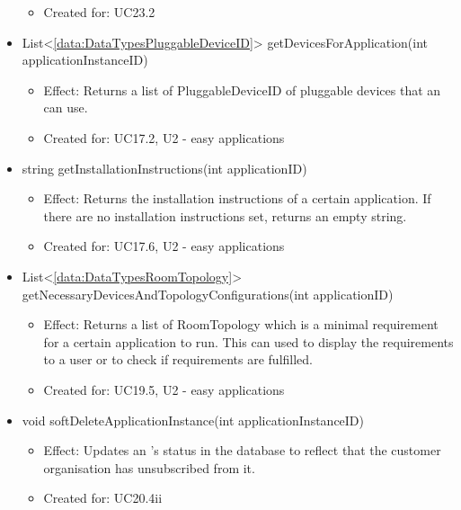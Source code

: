 \begin{description}
\begin{itemize}[noitemsep,nolistsep,leftmargin=-.25cm]
\begin{itemize}[noitemsep,nolistsep]
\item Created for: UC23.2
        \end{itemize}
      \item \textsf{List\textless{}\ref{data:DataTypesPluggableDeviceID}\textgreater{} getDevicesForApplication(int applicationInstanceID)}
        \begin{itemize}[noitemsep,nolistsep]
           \item Effect: Returns a list of PluggableDeviceID of pluggable devices that an  can use.
\item Created for: UC17.2, U2 - easy applications
        \end{itemize}
      \item \textsf{string getInstallationInstructions(int applicationID)}
        \begin{itemize}[noitemsep,nolistsep]
           \item Effect: Returns the installation instructions of a certain application. If there are no installation instructions set, returns an empty string.
\item Created for: UC17.6, U2 - easy applications
        \end{itemize}
      \item \textsf{List\textless{}\ref{data:DataTypesRoomTopology}\textgreater{} getNecessaryDevicesAndTopologyConfigurations(int applicationID)}
        \begin{itemize}[noitemsep,nolistsep]
           \item Effect: Returns a list of RoomTopology which is a minimal requirement for a certain application to run. This can used to display the requirements to a user or to check if requirements are fulfilled.
\item Created for: UC19.5, U2 - easy applications
        \end{itemize}
      \item \textsf{void softDeleteApplicationInstance(int applicationInstanceID)}
        \begin{itemize}[noitemsep,nolistsep]
           \item Effect: Updates an 's status in the database to reflect that the customer organisation has unsubscribed from it.
\item Created for: UC20.4ii
        \end{itemize}

\end{itemize}
\end{description}
